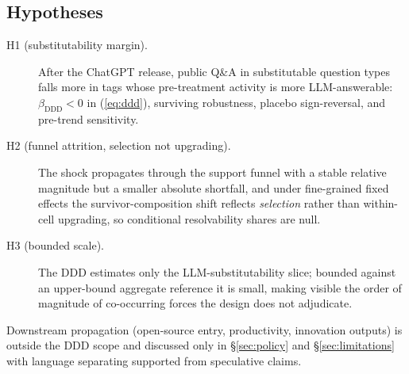 \subsection{Hypotheses}\label{ssec:hypotheses}\label{ssec:theory_concept}\label{ssec:theory_qa_as_input}\label{ssec:conceptual_significance}

\begin{description}
\item[H1 (substitutability margin).] After the ChatGPT release,
public Q\&A in substitutable question types falls more in tags
whose pre-treatment activity is more LLM-answerable:
$\beta_{\text{DDD}}<0$ in (\ref{eq:ddd}), surviving robustness,
placebo sign-reversal, and pre-trend sensitivity.
\item[H2 (funnel attrition, selection not upgrading).] The shock
propagates through the support funnel with a stable relative
magnitude but a smaller absolute shortfall, and under
fine-grained fixed effects the survivor-composition shift
reflects \emph{selection} rather than within-cell upgrading, so
conditional resolvability shares are null.
\item[H3 (bounded scale).] The DDD estimates only the
LLM-substitutability slice; bounded against an upper-bound
aggregate reference it is small, making visible the order of
magnitude of co-occurring forces the design does not adjudicate.
\end{description}

Downstream propagation (open-source entry, productivity,
innovation outputs) is outside the DDD scope and discussed only
in \S\ref{sec:policy} and \S\ref{sec:limitations} with language
separating supported from speculative claims.

